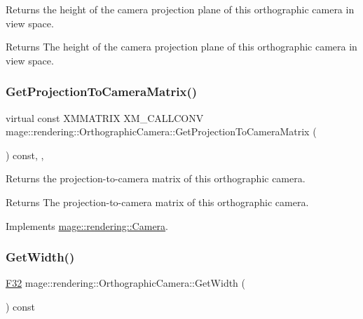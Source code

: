 Returns the height of the camera projection plane of this orthographic camera in view space.

\begin{DoxyReturn}{Returns}
The height of the camera projection plane of this orthographic camera in view space. 
\end{DoxyReturn}
\hypertarget{classmage_1_1rendering_1_1_orthographic_camera_a7d52862a3762dcaeadf26e8ae92d9d09}{}\label{classmage_1_1rendering_1_1_orthographic_camera_a7d52862a3762dcaeadf26e8ae92d9d09} 
\subsubsection{\texorpdfstring{Get\+Projection\+To\+Camera\+Matrix()}{GetProjectionToCameraMatrix()}}
{\footnotesize\ttfamily virtual const X\+M\+M\+A\+T\+R\+IX X\+M\+\_\+\+C\+A\+L\+L\+C\+O\+NV mage\+::rendering\+::\+Orthographic\+Camera\+::\+Get\+Projection\+To\+Camera\+Matrix (\begin{DoxyParamCaption}{ }\end{DoxyParamCaption}) const\hspace{0.3cm}{\ttfamily [override]}, {\ttfamily [virtual]}, {\ttfamily [noexcept]}}

Returns the projection-\/to-\/camera matrix of this orthographic camera.

\begin{DoxyReturn}{Returns}
The projection-\/to-\/camera matrix of this orthographic camera. 
\end{DoxyReturn}


Implements \hyperlink{classmage_1_1rendering_1_1_camera_abb21116f8a6c7513804431d23fa4cf17}{mage\+::rendering\+::\+Camera}.

\hypertarget{classmage_1_1rendering_1_1_orthographic_camera_a2e1bd4bec2bebac046b122bfd62b8960}{}\label{classmage_1_1rendering_1_1_orthographic_camera_a2e1bd4bec2bebac046b122bfd62b8960} 
\subsubsection{\texorpdfstring{Get\+Width()}{GetWidth()}}
{\footnotesize\ttfamily \hyperlink{namespacemage_aa97e833b45f06d60a0a9c4fc22ae02c0}{F32} mage\+::rendering\+::\+Orthographic\+Camera\+::\+Get\+Width (\begin{DoxyParamCaption}{ }\end{DoxyParamCaption}) const\hspace{0.3cm}{\ttfamily [noexcept]}}

